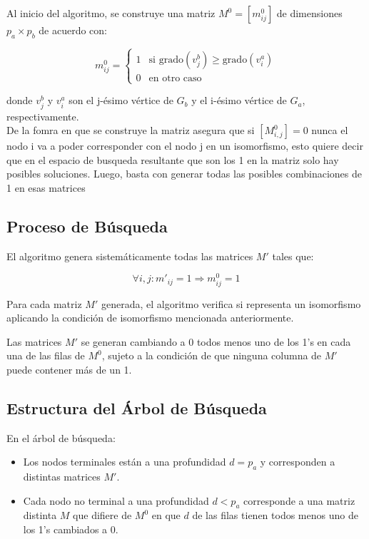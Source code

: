 \documentclass[12pt,a4paper]{article}
\begin{document}
Al inicio del algoritmo, se construye una matriz \(M^0 = [m^0_{ij}]\) de dimensiones \(p_a \times p_b\) de acuerdo con:

\[
m^0_{ij} = 
\begin{cases}
1 & \text{si } \text{grado}(v^b_j) \geq \text{grado}(v^a_i) \\
0 & \text{en otro caso}
\end{cases}
\]

donde \(v^b_j\) y \(v^a_i\) son el j-ésimo vértice de \(G_b\) y el i-ésimo vértice de \(G_a\), respectivamente.
\\
De la fomra en que se construye la matriz asegura que si \([M^0_{i,j}] = 0\) nunca el nodo i va a poder corresponder con el nodo j en un isomorfismo, esto quiere decir que en el espacio de busqueda resultante que son los 1 en la matriz solo hay posibles soluciones. Luego, basta con generar todas las posibles combinaciones de 1 en esas matrices
\subsection{Proceso de Búsqueda}

El algoritmo genera sistemáticamente todas las matrices \(M'\) tales que:

\[\forall i, j: m'_{ij} = 1 \Rightarrow m^0_{ij} = 1\]

Para cada matriz \(M'\) generada, el algoritmo verifica si representa un isomorfismo aplicando la condición de isomorfismo mencionada anteriormente.

Las matrices \(M'\) se generan cambiando a 0 todos menos uno de los 1's en cada una de las filas de \(M^0\), sujeto a la condición de que ninguna columna de \(M'\) puede contener más de un 1.

\subsection{Estructura del Árbol de Búsqueda}

En el árbol de búsqueda:

\begin{itemize}
    \item Los nodos terminales están a una profundidad \(d = p_a\) y corresponden a distintas matrices \(M'\).
    \item Cada nodo no terminal a una profundidad \(d < p_a\) corresponde a una matriz distinta \(M\) que difiere de \(M^0\) en que \(d\) de las filas tienen todos menos uno de los 1's cambiados a 0.
\end{itemize}
\end{document}
